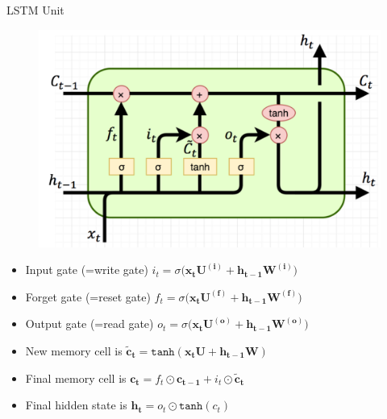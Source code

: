 \begin{frame}{LSTM Unit}
\centering
    \begin{figure}
        \includegraphics[scale=0.15]{./figure/lstm.png}
    \end{figure}
    \begin{itemize}
        \item Input gate (=write gate) $i_t = \sigma \big( \bm{x_tU^{(i)}} + \bm{h_{t-1}W^{(i)}}   \big) $
        \item Forget gate (=reset gate) $f_t = \sigma \big( \bm{x_tU^{(f)}} + \bm{h_{t-1}W^{(f)}}   \big) $
        \item Output gate (=read gate) $o_t = \sigma \big( \bm{x_tU^{(o)}} + \bm{h_{t-1}W^{(o)}}   \big) $
        
        \item New memory cell is $\bm{\tilde{c}_t} = \texttt{tanh} ( \bm{x_tU}+\bm{h_{t-1}W} ) $
        \item Final memory cell is $\bm{c_t} = f_t \odot \bm{c_{t-1}} + i_t \odot \bm{\tilde{c}_t}$
        \item Final hidden state is $\bm{h_t} = o_t \odot \texttt{tanh}(c_t)$
    \end{itemize}
\end{frame}
